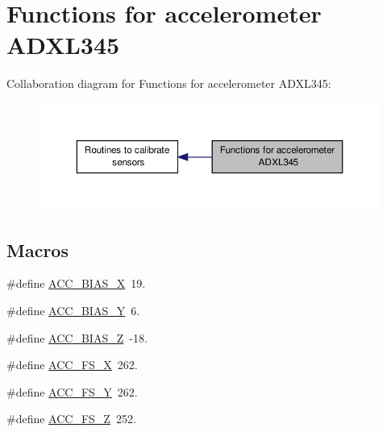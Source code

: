 \hypertarget{group__acc}{\section{Functions for accelerometer A\-D\-X\-L345}
\label{group__acc}
}
Collaboration diagram for Functions for accelerometer A\-D\-X\-L345\-:
\nopagebreak
\begin{figure}[H]
\begin{center}
\leavevmode
\includegraphics[width=350pt]{group__acc}
\end{center}
\end{figure}
\subsection*{Macros}
\begin{DoxyCompactItemize}
\item 
\#define \hyperlink{group__acc_ga355ea8f6ceed1e1d419a3ea2271bfca3}{A\-C\-C\-\_\-\-B\-I\-A\-S\-\_\-\-X}~19.
\item 
\#define \hyperlink{group__acc_ga34180f1c97e84a814ef181f62bf4b68f}{A\-C\-C\-\_\-\-B\-I\-A\-S\-\_\-\-Y}~6.
\item 
\#define \hyperlink{group__acc_ga794f762650b6f228ffb8d50d1323dbea}{A\-C\-C\-\_\-\-B\-I\-A\-S\-\_\-\-Z}~-\/18.
\item 
\#define \hyperlink{group__acc_ga76e6967cb5a86ec34986b4583ac09831}{A\-C\-C\-\_\-\-F\-S\-\_\-\-X}~262.
\item 
\#define \hyperlink{group__acc_ga13d3aaab3b5800b11351cbd1246c8918}{A\-C\-C\-\_\-\-F\-S\-\_\-\-Y}~262.
\item 
\#define \hyperlink{group__acc_gaf1d3370cc0958289199c8c13470602d4}{A\-C\-C\-\_\-\-F\-S\-\_\-\-Z}~252.
\end{DoxyCompactItemize}

